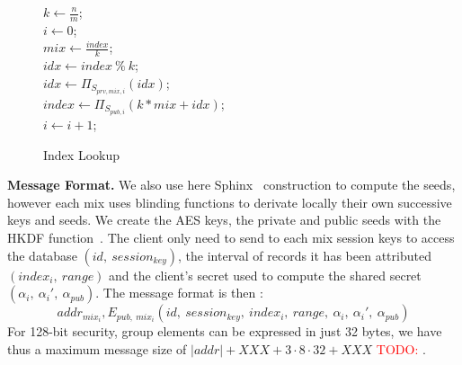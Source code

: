 \documentclass{llncs}
\newcommand{\todo}[1]{\textcolor{red}{TODO: #1}}
\begin{document}
\begin{figure}
\centering
\begin{minipage}[t]{0.5\textwidth}
\begin{algorithm}[H]
\DontPrintSemicolon
{}
$k \gets \frac{n}{m}$;\\
$i \gets 0$;\\
{
	$mix \gets \frac{index}{k} $;\\
	$idx \gets index\ \%\ k$;\\
	$idx \gets {\Pi}_{S_{prv, mix, i}}(idx) $;\\
	$index \gets {\Pi}_{S_{pub, i}}(k*mix+idx)$;\\
	$i\gets i+1$;
}
\caption{Index Lookup}
\label{alg:IAS}
\end{algorithm}
\end{minipage}
\end{figure}


\noindent\textbf{Message Format.}
We also use here Sphinx~\cite{XXXsphinx} construction to compute the seeds, however each mix uses blinding functions to derivate locally their own successive keys and seeds. \iffalse\\
Let $\kappa$ be the security parameter. We call $\mathcal{G}$ a prime order cyclic group satisfying the Decisional Diffie-Hellman Assumption. $\mathcal{G}^*$ is the set of non-identity elements of $\mathcal{G}$. The element $g$ is a generator of the group, and $q$ is the prime order of $\mathcal{G}$ with $q \approx 2^{2\kappa}$.\\
We suppose each mix owns a pair of keys ($\ priv_i \in \mathbb{Z}_{q}^*$, $pub_i=g^{priv_i}\in \mathcal{G}^*$). We assume the existence of a PKI that publishes a list of all ($mix_i$,\ $pub_i$) pair.
The client randomly chooses $x\in_\mathcal{R} \mathbb{Z}_q^*$ and sends to the mix $mix_i$ the element $\alpha_i=g^{x\cdot b_i}$ with $b_i$ a binding factors, the shared secret is then $s_i=pub_i^{x\cdot b_i}$.
\fi
We create the AES keys, the private and public seeds with the HKDF function~\cite{XXXHKDF}. The client only need to send to each mix session keys to access the database $(id,\ session_{key})$, the interval of records it has been attributed $(index_i,\ range)$ and the client's secret used to compute the shared secret $(\alpha_i,\ \alpha_i',\ \alpha_{pub})$.
The message format is then : $${addr_{mix_i},E_{pub,\ mix_i}\left(id,\ session_{key},\ index_i,\ range,\ \alpha_i,\ \alpha_i',\ \alpha_{pub} \right )}$$ For 128-bit security, group elements can be expressed in just 32 bytes, we have thus a maximum message size of $|addr|+XXX + 3 \cdot 8 \cdot 32 + XXX$ \todo{}. 
\end{document}
